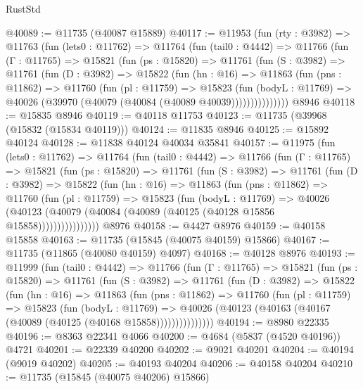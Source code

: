 \begin{lexlean}{RustStd}
\begin{coremodule}
@40089 := @11735 (@40087 @15889)
@40117 := @11953
    (fun (rty : @3982) =>
    @11763
      (fun (lets0 : @11762) =>
      @11764
        (fun (tail0 : @4442) =>
        @11766
          (fun (Γ : @11765) =>
          @15821
            (fun (ps : @15820) =>
            @11761
              (fun (S : @3982) =>
              @11761
                (fun (D : @3982) =>
                @15822
                  (fun (hn : @16) =>
                  @11863
                    (fun (pns : @11862) =>
                    @11760
                      (fun (pl : @11759) =>
                      @15823
                        (fun (bodyL : @11769) =>
                        @40026 (@39970 (@40079 (@40084 (@40089 @40039)))))))))))))))
    @8946
@40118 := @15835 @8946
@40119 := @40118 @11753
@40123 := @11735 (@39968 (@15832 (@15834 @40119)))
@40124 := @11835 @8946
@40125 := @15892 @40124
@40128 := @11838 @40124 @40034 @35841
@40157 := @11975
    (fun (lets0 : @11762) =>
    @11764
      (fun (tail0 : @4442) =>
      @11766
        (fun (Γ : @11765) =>
        @15821
          (fun (ps : @15820) =>
          @11761
            (fun (S : @3982) =>
            @11761
              (fun (D : @3982) =>
              @15822
                (fun (hn : @16) =>
                @11863
                  (fun (pns : @11862) =>
                  @11760
                    (fun (pl : @11759) =>
                    @15823
                      (fun (bodyL : @11769) =>
                      @40026
                        (@40123
                          (@40079 (@40084 (@40089 (@40125 (@40128 @15856 @15858))))))))))))))))
    @8976
@40158 := @4427 @8976
@40159 := @40158 @15858
@40163 := @11735 (@15845 (@40075 @40159) @15866)
@40167 := @11735 (@11865 (@40080 @40159) @4097)
@40168 := @40128 @8976
@40193 := @11999
    (fun (tail0 : @4442) =>
    @11766
      (fun (Γ : @11765) =>
      @15821
        (fun (ps : @15820) =>
        @11761
          (fun (S : @3982) =>
          @11761
            (fun (D : @3982) =>
            @15822
              (fun (hn : @16) =>
              @11863
                (fun (pns : @11862) =>
                @11760
                  (fun (pl : @11759) =>
                  @15823
                    (fun (bodyL : @11769) =>
                    @40026 (@40123 (@40163 (@40167 (@40089 (@40125 (@40168 @15858)))))))))))))))
@40194 := @8980 @22335
@40196 := @8363 @22341 @4066
@40200 := @4684 (@5837 (@4520 @40196)) @4721
@40201 := @22339 @40200
@40202 := @9021 @40201
@40204 := @40194 (@9019 @40202)
@40205 := @40193 @40204
@40206 := @40158 @40204
@40210 := @11735 (@15845 (@40075 @40206) @15866)

\end{coremodule}
\end{lexlean}
